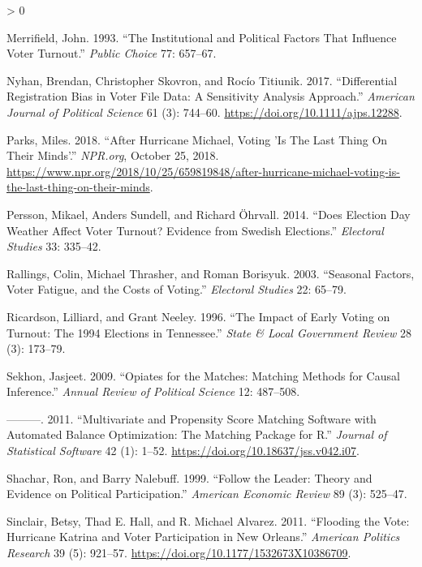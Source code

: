 \documentclass[
  12pt,
]{article}
\newlength{\cslhangindent}
\newenvironment{CSLReferences}[2] %
 {%
  \setlength{\parindent}{0pt}
  \ifodd #1 \everypar{\setlength{\hangindent}{\cslhangindent}}\ignorespaces\fi
  \ifnum #2 > 0
  \setlength{\parskip}{#2\baselineskip}
  \fi
 }%
 {}
\begin{document}
\begin{CSLReferences}{1}{0}
\leavevmode\hypertarget{ref-Merrifield1993}{}%
Merrifield, John. 1993. {``The {Institutional} and {Political Factors} That {Influence Voter Turnout}.''} \emph{Public Choice} 77: 657--67.

\leavevmode\hypertarget{ref-Nyhan2017}{}%
Nyhan, Brendan, Christopher Skovron, and Rocío Titiunik. 2017. {``Differential {Registration Bias} in {Voter File Data}: {A Sensitivity Analysis Approach}.''} \emph{American Journal of Political Science} 61 (3): 744--60. \url{https://doi.org/10.1111/ajps.12288}.

\leavevmode\hypertarget{ref-Parks2018}{}%
Parks, Miles. 2018. {``After {Hurricane Michael}, {Voting} '{Is The Last Thing On Their Minds}'.''} \emph{NPR.org}, October 25, 2018. \url{https://www.npr.org/2018/10/25/659819848/after-hurricane-michael-voting-is-the-last-thing-on-their-minds}.

\leavevmode\hypertarget{ref-Persson2014}{}%
Persson, Mikael, Anders Sundell, and Richard Öhrvall. 2014. {``Does {Election Day Weather Affect Voter Turnout}? {Evidence} from {Swedish Elections}.''} \emph{Electoral Studies} 33: 335--42.

\leavevmode\hypertarget{ref-Rallings2003}{}%
Rallings, Colin, Michael Thrasher, and Roman Borisyuk. 2003. {``Seasonal {Factors}, Voter Fatigue, and the Costs of Voting.''} \emph{Electoral Studies} 22: 65--79.

\leavevmode\hypertarget{ref-Ricardson1996}{}%
Ricardson, Lilliard, and Grant Neeley. 1996. {``The {Impact} of {Early Voting} on {Turnout}: {The} 1994 {Elections} in {Tennessee}.''} \emph{State \& Local Government Review} 28 (3): 173--79.

\leavevmode\hypertarget{ref-Sekhon2009}{}%
Sekhon, Jasjeet. 2009. {``Opiates for the {Matches}: {Matching Methods} for {Causal Inference}.''} \emph{Annual Review of Political Science} 12: 487--508.

\leavevmode\hypertarget{ref-Sekhon2011}{}%
---------. 2011. {``Multivariate and {Propensity Score Matching Software} with {Automated Balance Optimization}: {The Matching} Package for {R}.''} \emph{Journal of Statistical Software} 42 (1): 1--52. \url{https://doi.org/10.18637/jss.v042.i07}.

\leavevmode\hypertarget{ref-Shachar1999}{}%
Shachar, Ron, and Barry Nalebuff. 1999. {``Follow the {Leader}: {Theory} and {Evidence} on {Political Participation}.''} \emph{American Economic Review} 89 (3): 525--47.

\leavevmode\hypertarget{ref-Sinclair2011}{}%
Sinclair, Betsy, Thad E. Hall, and R. Michael Alvarez. 2011. {``Flooding the {Vote}: {Hurricane Katrina} and {Voter Participation} in {New Orleans}.''} \emph{American Politics Research} 39 (5): 921--57. \url{https://doi.org/10.1177/1532673X10386709}.


\end{CSLReferences}
\end{document}

